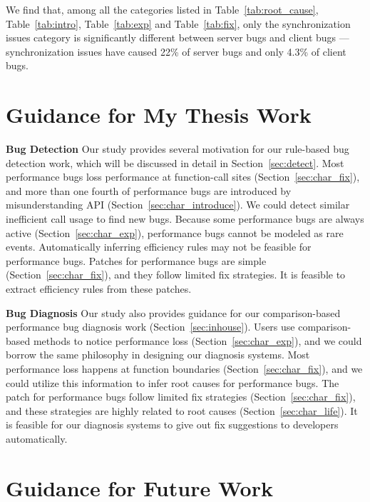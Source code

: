 We find that, among all the categories listed in Table~\ref{tab:root_cause}, Table~\ref{tab:intro}, Table~\ref{tab:exp} and Table~\ref{tab:fix},
only the synchronization issues category
is significantly different between server bugs 
and client bugs ---
synchronization issues have caused 22\% of server bugs and only 
4.3\% of client bugs.



\section{Guidance for My Thesis Work}


{\bf Bug Detection}
Our study provides several motivation for our rule-based bug detection work, 
which will be discussed in detail in Section~\ref{sec:detect}. 
Most performance bugs loss performance at function-call sites (Section~\ref{sec:char_fix}), 
and more than one fourth of performance bugs are introduced by misunderstanding API (Section~\ref{sec:char_introduce}). 
We could detect similar inefficient call usage to find new bugs. 
Because some performance bugs are always active (Section~\ref{sec:char_exp}), 
performance bugs cannot be modeled as rare events.
Automatically inferring efficiency rules may not be feasible for performance bugs. 
Patches for performance bugs are simple (Section~\ref{sec:char_fix}), and they follow limited fix strategies. It is feasible to extract efficiency rules from these patches. 

{\bf Bug Diagnosis}
Our study also provides guidance for our comparison-based performance 
bug diagnosis work (Section~\ref{sec:inhouse}). 
Users use comparison-based methods to notice performance loss (Section~\ref{sec:char_exp}), 
and we could borrow the same philosophy in designing our diagnosis systems. 
Most performance loss happens at function boundaries (Section~\ref{sec:char_fix}), 
and we could utilize this information to infer root causes for performance bugs. 
The patch for performance bugs follow limited fix strategies (Section~\ref{sec:char_fix}), 
and these strategies are highly related to root causes (Section~\ref{sec:char_life}). 
It is feasible for our diagnosis systems to give out fix suggestions to developers automatically. 



\section{Guidance for Future Work}

